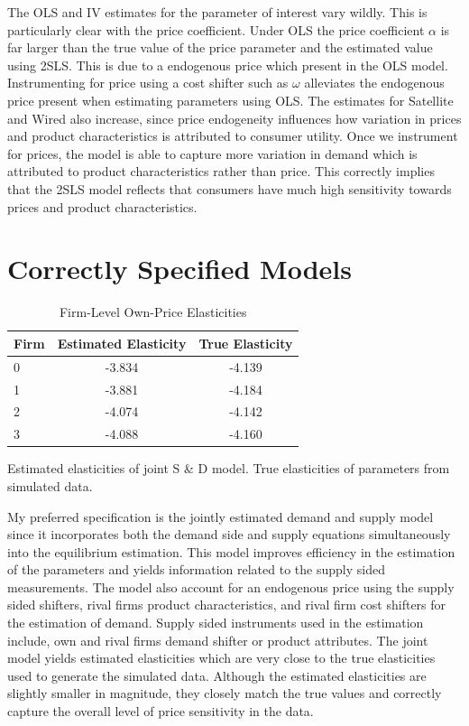\documentclass[12pt]{article}
\begin{document}
The OLS and IV estimates for the parameter of interest vary wildly. This is particularly clear with the price coefficient. Under OLS the price coefficient $\alpha$ is far larger than the true value of the price parameter and the estimated value using 2SLS. This is due to a endogenous price which present in the OLS model. Instrumenting for price using a cost shifter such as $\omega$ alleviates the endogenous price present when estimating parameters using OLS. The estimates for Satellite and Wired also increase, since price endogeneity influences how variation in prices and product characteristics is attributed to consumer utility. Once we instrument for prices, the model is able to capture more variation in demand which is attributed to product characteristics rather than price. This correctly implies that the 2SLS model reflects that consumers have much high sensitivity towards prices and product characteristics. 

\section{Correctly Specified Models}
\vspace{-0.1in}
\begin{table}[!htbp]\centering
\caption{Firm-Level Own-Price Elasticities}
\begin{threeparttable}
\footnotesize
\begin{tabular}{lcc}
\toprule
Firm & Estimated Elasticity & True Elasticity \\
\midrule
0 & -3.834 & -4.139 \\
1 & -3.881 & -4.184 \\
2 & -4.074 & -4.142 \\
3 & -4.088 & -4.160 \\
\bottomrule
\end{tabular}
\begin{tablenotes}
\footnotesize
\item Estimated elasticities of joint S \& D model. True elasticities of parameters from simulated data.
\end{tablenotes}

\end{threeparttable}
\end{table}

My preferred specification is the jointly estimated demand and supply model since it incorporates both the demand side and supply equations simultaneously into the equilibrium estimation. This model improves efficiency in the estimation of the parameters and yields information related to the supply sided measurements. The model also account for an endogenous price using the supply sided shifters, rival firms product characteristics, and rival firm cost shifters for the estimation of demand. Supply sided instruments used in the estimation include, own and rival firms demand shifter or product attributes. The joint model yields estimated elasticities which are very close to the true elasticities used to generate the simulated data. Although the estimated elasticities are slightly smaller in magnitude, they closely match the true values and correctly capture the overall level of price sensitivity in the data.
\end{document}
